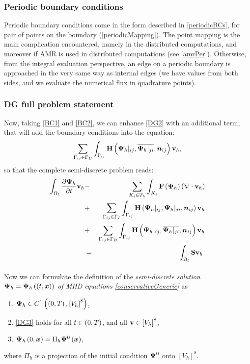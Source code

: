 \subsubsection{Periodic boundary conditions}
\label{sec:periodicDg}
Periodic boundary conditions come in the form described in \ref{periodicBCs}, for pair of points on the boundary (\ref{periodicMapping}). The point mapping is the main complication encountered, namely in the distributed computations, and moreover if AMR is used in distributed computations (see \ref{amrPer}). Otherwise, from the integral evaluation perspective, an edge on a periodic boundary is approached in the very same way as internal edges (we have values from both sides, and we evaluate the numerical flux in quadrature points).

\subsubsection{DG full problem statement}
Now, taking \ref{BC1} and \ref{BC2}, we can enhance \ref{DG2} with an additional term, that will add the boundary conditions into the equation:
$$
\sum_{\Gamma_{ij}\in\Gamma_B} \int_{\Gamma_{ij}} \mathrm{\mathbf{H}}\left({\mathrm{\mathbf{\Psi}}_h}|_{ij}, \overline{{\mathrm{\mathbf{\Psi}}_h}|_{ji}}, \mbox{\boldmath $n$}_{ij}\right) \mathrm{\mathbf{v}}_h,
$$
so that the complete semi-discrete problem reads:
\begin{eqnarray}
\label{DG3} \int_{\Omega_{t}} \frac{\partial{{\mathrm{\mathbf{\Psi}}_h}}}{\partial{t}} \mathrm{\mathbf{v}}_h & - & \sum_{K_i \in T_h}\int_{K_i}\mathrm{\mathbf{F}}\left({\mathrm{\mathbf{\Psi}}_h}\right) \left(\nabla \cdot \mathrm{\mathbf{v}}_h\right)\\ \nonumber & + & \sum_{\Gamma_{ij}\in\Gamma_I} \int_{\Gamma_{ij}} \mathrm{\mathbf{H}}\left({\mathrm{\mathbf{\Psi}}_h}|_{ij}, {\mathrm{\mathbf{\Psi}}_h}|_{ji}, \mbox{\boldmath $n$}_{ij}\right) \mathrm{\mathbf{v}}_h\\\nonumber
 & + & \sum_{\Gamma_{ij}\in\Gamma_B} \int_{\Gamma_{ij}} \mathrm{\mathbf{H}}\left({\mathrm{\mathbf{\Psi}}_h}|_{ij}, \overline{{\mathrm{\mathbf{\Psi}}_h}|_{ji}}, \mbox{\boldmath $n$}_{ij}\right) \mathrm{\mathbf{v}}_h\\\nonumber
 & = & \int_{\Omega_{t}} \mathrm{\mathbf{S}} \mathrm{\mathbf{v}}_h.
\end{eqnarray}

\paragraph{}
Now we can formulate the definition of the \textit{semi-discrete solution ${\mathrm{\mathbf{\Psi}}_h} = {\mathrm{\mathbf{\Psi}}_h}\left((t, \mbox{\boldmath $x$}\right))$ of MHD equations \ref{conservativeGeneric}} as
\begin{enumerate}
    \label{discreteSlnDef}
    \item ${\mathrm{\mathbf{\Psi}}_h} \in C^{1}\left(\left(0, T\right), \left[V_h\right]^8\right)$,
    \item \ref{DG3} holds for all $t\in\left(0, T\right)$, and all $\mathrm{\mathbf{v}}\in \left[V_h\right]^8$,
    \item ${\mathrm{\mathbf{\Psi}}_h}\left(0, \mbox{\boldmath $x$}\right) = \Pi_h \mathrm{\mathbf{\Psi}}^0\left(\mbox{\boldmath $x$}\right)$,
\end{enumerate}
where $\Pi_h$ is a projection of the initial condition $\mathrm{\mathbf{\Psi}}^0$ onto $\left[V_h\right]^8$.


